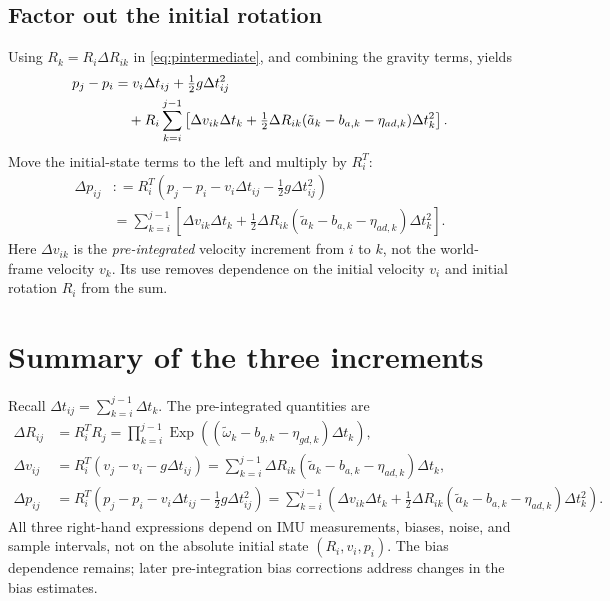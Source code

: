 \documentclass[11pt,a4paper]{article}
\newcommand{\Exp}{\operatorname{Exp}}
\newcommand{\defeq}{\mathrel{\mathop:}=}
\begin{document}
\subsection{Factor out the initial rotation}
Using $R_k=R_i\Delta R_{ik}$ in \eqref{eq:pintermediate}, and combining the gravity terms, yields
\begin{align}
p_j-p_i
&=v_i\Delta t_{ij}+\tfrac12g\Delta t_{ij}^2\notag\\
&\quad+R_i\sum_{k=i}^{j-1}\left[\Delta v_{ik}\Delta t_k+\tfrac12\Delta R_{ik}(\tilde a_k-b_{a,k}-\eta_{ad,k})\Delta t_k^2\right].
\end{align}
Move the initial-state terms to the left and multiply by $R_i^T$:
\begin{equation}\label{eq:dp}
\boxed{\begin{aligned}
\Delta p_{ij}&\defeq R_i^T\left(p_j-p_i-v_i\Delta t_{ij}-\tfrac12g\Delta t_{ij}^2\right)\\
&=\sum_{k=i}^{j-1}\left[\Delta v_{ik}\Delta t_k+\tfrac12\Delta R_{ik}(\tilde a_k-b_{a,k}-\eta_{ad,k})\Delta t_k^2\right].
\end{aligned}}
\end{equation}
Here $\Delta v_{ik}$ is the \emph{pre-integrated} velocity increment from $i$ to $k$, not the world-frame velocity $v_k$. Its use removes dependence on the initial velocity $v_i$ and initial rotation $R_i$ from the sum.

\section{Summary of the three increments}
Recall $\Delta t_{ij}=\sum_{k=i}^{j-1}\Delta t_k$. The pre-integrated quantities are
\begin{subequations}\label{eq:summary}
\begin{align}
\boxed{\Delta R_{ij}}&=R_i^TR_j
=\prod_{k=i}^{j-1}\Exp\!\left((\tilde\omega_k-b_{g,k}-\eta_{gd,k})\Delta t_k\right),\\
\boxed{\Delta v_{ij}}&=R_i^T(v_j-v_i-g\Delta t_{ij})
=\sum_{k=i}^{j-1}\Delta R_{ik}(\tilde a_k-b_{a,k}-\eta_{ad,k})\Delta t_k,\\
\boxed{\Delta p_{ij}}&=R_i^T\left(p_j-p_i-v_i\Delta t_{ij}-\tfrac12g\Delta t_{ij}^2\right)
=\sum_{k=i}^{j-1}\left(\Delta v_{ik}\Delta t_k+\tfrac12\Delta R_{ik}(\tilde a_k-b_{a,k}-\eta_{ad,k})\Delta t_k^2\right).
\end{align}
\end{subequations}
All three right-hand expressions depend on IMU measurements, biases, noise, and sample intervals, not on the absolute initial state $(R_i,v_i,p_i)$. The bias dependence remains; later pre-integration bias corrections address changes in the bias estimates.
\end{document}
